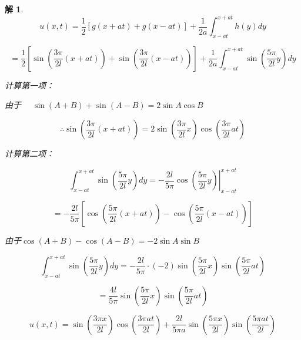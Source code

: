 \documentclass[12pt,a4paper]{article}
\newtheorem*{solution}{解}
\begin{document}
\begin{solution}
	\begin{equation*}
		u(x,t) = \frac{1}{2} \left[ g(x + at) + g(x - at) \right] + \frac{1}{2a} \int_{x - at}^{x + at} h(y) dy
	\end{equation*}
	
	\begin{equation*}
		= \frac{1}{2} \left[ \sin\left( \frac{3\pi}{2l}(x + at) \right) + \sin\left( \frac{3\pi}{2l}(x - at) \right) \right]	+ \frac{1}{2a} \int_{x - at}^{x + at} \sin\left( \frac{5\pi}{2l} y \right) dy
	\end{equation*}
	


计算第一项：

由于 $\quad \sin(A + B) + \sin(A - B) = 2 \sin A \cos B$

	
	\begin{equation*}
		\therefore \sin\left( \frac{3\pi}{2l}(x + at) \right) = 2 \sin\left( \frac{3\pi}{2l} x \right) \cos\left( \frac{3\pi}{2l} at \right)
	\end{equation*}
	
	计算第二项：
	
	\begin{equation*}
		\int_{x - at}^{x + at} \sin\left( \frac{5\pi}{2l} y \right) dy	= \left. -\frac{2l}{5\pi} \cos\left( \frac{5\pi}{2l} y \right) \right|_{x - at}^{x + at}
	\end{equation*}
	
	\begin{equation*}
		= -\frac{2l}{5\pi} \left[ \cos\left( \frac{5\pi}{2l}(x + at) \right) - \cos\left( \frac{5\pi}{2l}(x - at) \right) \right]
	\end{equation*}
	



	由于$	\cos(A + B) - \cos(A - B) = -2 \sin A \sin B$

	
	\begin{equation*}
		\int_{x - at}^{x + at} \sin\left( \frac{5\pi}{2l} y \right) dy = -\frac{2l}{5\pi} \cdot (-2) \sin\left( \frac{5\pi}{2l} x \right) \sin\left( \frac{5\pi}{2l} at \right)
	\end{equation*}
	
	\begin{equation*}
		= \frac{4l}{5\pi} \sin\left( \frac{5\pi}{2l} x \right) \sin\left( \frac{5\pi}{2l} at \right)
	\end{equation*}
	
	\begin{equation*}
	 	u(x,t) =\sin\left( \frac{3\pi x}{2l} \right) \cos\left( \frac{3\pi at}{2l} \right) + \frac{2l}{5\pi a} \sin\left( \frac{5\pi x}{2l} \right) \sin\left( \frac{5\pi at}{2l} \right)
	\end{equation*}
	
	
	
	
	
	
\end{solution}
\end{document}
